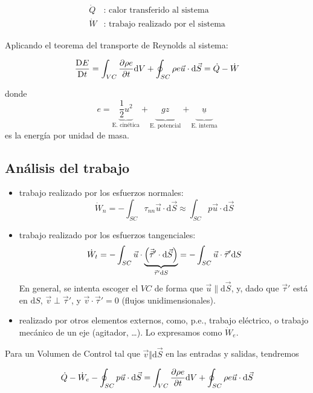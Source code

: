 	
	\[
	\begin{array}{cc}
		\dot{Q} & \textrm{: calor transferido al sistema}\\
		\dot{W} & \textrm{: trabajo realizado por el sistema}
	\end{array}
	\]
	
	Aplicando el teorema del transporte de Reynolds al sistema:
	
	\[
	\frac{\text{D} E}{\text{D} t}=\int_{VC}\frac{\partial \rho e}{\partial t}\text{d}V+\oint_{SC}\rho e\vec{u}\cdot\text{d}\vec{S}=\dot{Q}-\dot{W}
	\]
	
	donde 
	\[
	e=\underbrace{\frac{1}{2}u^{2}}_{\text{E. cinética}}+\underbrace{\phantom{\frac{1}{2}}gz\phantom{\frac{1}{2}}}_{\text{E. potencial}}+\underbrace{\phantom{\frac{1}{2}}\underline{u}\phantom{\frac{1}{2}}}_{\text{E. interna}}
	\]
	es la energía por unidad de masa.


\subsection{Análisis del trabajo}

	

	\begin{itemize}
		\item trabajo realizado por los esfuerzos normales: 
		\[
		\dot{W}_{n}=-\int_{SC}\tau_{nn}\vec{u}\cdot\text{d}\vec{S}\approx\int_{SC}p\vec{u}\cdot\text{d}\vec{S}
		\]
		
		\item trabajo realizado por los esfuerzos tangenciales: 
		\[
		\dot{W}_{t}=-\int_{SC}\vec{u}\cdot\underbrace{\left(\vec{\vec \tau}'\cdot\text{d}\vec{S}\right)}_{\vec{\tau}'\text{d}S}=-\int_{SC}\vec{u}\cdot\vec{\tau}'\text{d}S
		\]
		En general, se intenta escoger el $VC$ de forma que $\vec{u}\parallel\text{d}\vec{S}$,
		y, dado que $\vec{\tau}'$ está en $\text{d}S$, $\vec{v}\perp\vec{\tau}'$,
		y $\vec{v}\cdot\vec{\tau}'=0$ (flujos unidimensionales). 
		\item realizado por otros elementos externos, como, p.e., trabajo eléctrico,
		o trabajo mecánico de un eje (agitador, \ldots ). Lo expresamos como
		$\dot{W}_{e}$.
	\end{itemize}

	
	Para un Volumen de Control tal que $\vec{v}\Vert\text{d}\vec{S}$
	en las entradas y salidas, tendremos
	
	\[
	\dot{Q}-\dot{W}_{e}-\oint_{SC}p\vec{u}\cdot\text{d}\vec{S}=\int_{VC}\frac{\partial \rho e}{\partial t}\text{d}V+\oint_{SC}\rho e\vec{u}\cdot\text{d}\vec{S}
	\]
	

